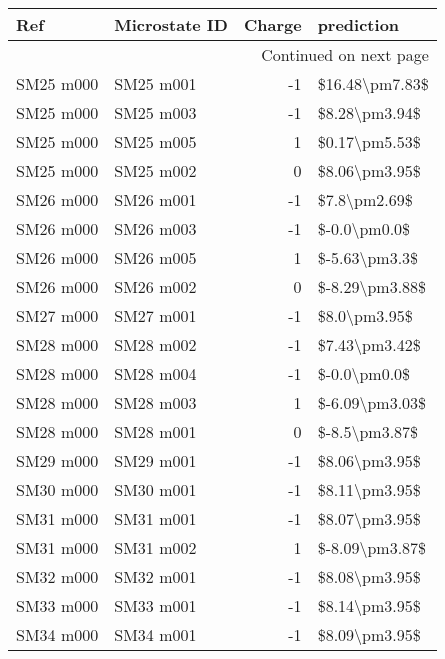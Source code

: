 \begin{longtable}{llrl}
\toprule
       Ref & Microstate ID &  Charge &       prediction \\
\midrule
\endhead
\midrule
\multicolumn{4}{r}{{Continued on next page}} \\
\midrule
\endfoot

\bottomrule
\endlastfoot
 SM25 m000 &     SM25 m001 &      -1 &   \$16.48\textbackslash pm7.83\$ \\
 SM25 m000 &     SM25 m003 &      -1 &    \$8.28\textbackslash pm3.94\$ \\
 SM25 m000 &     SM25 m005 &       1 &    \$0.17\textbackslash pm5.53\$ \\
 SM25 m000 &     SM25 m002 &       0 &    \$8.06\textbackslash pm3.95\$ \\
 SM26 m000 &     SM26 m001 &      -1 &     \$7.8\textbackslash pm2.69\$ \\
 SM26 m000 &     SM26 m003 &      -1 &     \$-0.0\textbackslash pm0.0\$ \\
 SM26 m000 &     SM26 m005 &       1 &    \$-5.63\textbackslash pm3.3\$ \\
 SM26 m000 &     SM26 m002 &       0 &   \$-8.29\textbackslash pm3.88\$ \\
 SM27 m000 &     SM27 m001 &      -1 &     \$8.0\textbackslash pm3.95\$ \\
 SM28 m000 &     SM28 m002 &      -1 &    \$7.43\textbackslash pm3.42\$ \\
 SM28 m000 &     SM28 m004 &      -1 &     \$-0.0\textbackslash pm0.0\$ \\
 SM28 m000 &     SM28 m003 &       1 &   \$-6.09\textbackslash pm3.03\$ \\
 SM28 m000 &     SM28 m001 &       0 &    \$-8.5\textbackslash pm3.87\$ \\
 SM29 m000 &     SM29 m001 &      -1 &    \$8.06\textbackslash pm3.95\$ \\
 SM30 m000 &     SM30 m001 &      -1 &    \$8.11\textbackslash pm3.95\$ \\
 SM31 m000 &     SM31 m001 &      -1 &    \$8.07\textbackslash pm3.95\$ \\
 SM31 m000 &     SM31 m002 &       1 &   \$-8.09\textbackslash pm3.87\$ \\
 SM32 m000 &     SM32 m001 &      -1 &    \$8.08\textbackslash pm3.95\$ \\
 SM33 m000 &     SM33 m001 &      -1 &    \$8.14\textbackslash pm3.95\$ \\
 SM34 m000 &     SM34 m001 &      -1 &    \$8.09\textbackslash pm3.95\$ \\

\end{longtable}
